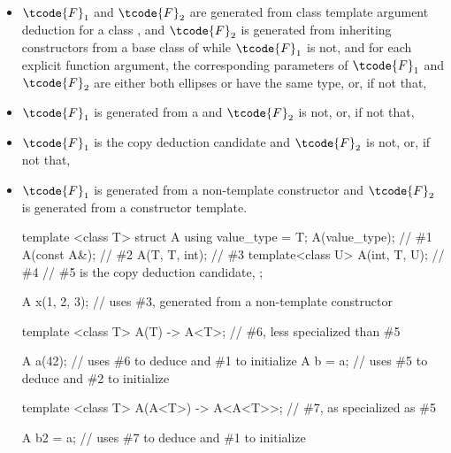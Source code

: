 \begin{itemize}
\item
$\tcode{F}_1$ and $\tcode{F}_2$ are generated
from class template argument deduction
for a class , and
$\tcode{F}_2$ is generated
from inheriting constructors from a base class of 
while $\tcode{F}_1$ is not, and
for each explicit function argument,
the corresponding parameters of $\tcode{F}_1$ and $\tcode{F}_2$
are either both ellipses or have the same type,
or, if not that,

\item
$\tcode{F}_1$ is generated from a
and $\tcode{F}_2$ is not, or, if not that,

\item
$\tcode{F}_1$ is the copy deduction candidate
and $\tcode{F}_2$ is not, or, if not that,

\item
$\tcode{F}_1$ is generated from a non-template constructor
and $\tcode{F}_2$ is generated from a constructor template.
\begin{example}
\begin{codeblock}
template <class T> struct A {
  using value_type = T;
  A(value_type);    // \#1
  A(const A&);      // \#2
  A(T, T, int);     // \#3
  template<class U>
    A(int, T, U);   // \#4
  // \#5 is the copy deduction candidate, 
};

A x(1, 2, 3);       // uses \#3, generated from a non-template constructor

template <class T>
A(T) -> A<T>;       // \#6, less specialized than \#5

A a(42);            // uses \#6 to deduce  and \#1 to initialize
A b = a;            // uses \#5 to deduce  and \#2 to initialize

template <class T>
A(A<T>) -> A<A<T>>; // \#7, as specialized as \#5

A b2 = a;           // uses \#7 to deduce  and \#1 to initialize
\end{codeblock}
\end{example}
\end{itemize}

